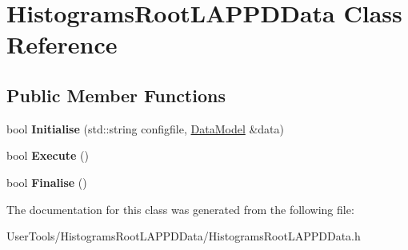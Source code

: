 \hypertarget{classHistogramsRootLAPPDData}{
\section{HistogramsRootLAPPDData Class Reference}
\label{classHistogramsRootLAPPDData}
}
\subsection*{Public Member Functions}
\begin{DoxyCompactItemize}
\item 
\hypertarget{classHistogramsRootLAPPDData_ab87ee19ac23e1a888976464ec0e9b199}{
bool {\bfseries Initialise} (std::string configfile, \hyperlink{classDataModel}{DataModel} \&data)}
\label{classHistogramsRootLAPPDData_ab87ee19ac23e1a888976464ec0e9b199}

\item 
\hypertarget{classHistogramsRootLAPPDData_a81c098fc773fb9bb365beb47aefd67d7}{
bool {\bfseries Execute} ()}
\label{classHistogramsRootLAPPDData_a81c098fc773fb9bb365beb47aefd67d7}

\item 
\hypertarget{classHistogramsRootLAPPDData_abc484166b3afed20afc9a702c3a003da}{
bool {\bfseries Finalise} ()}
\label{classHistogramsRootLAPPDData_abc484166b3afed20afc9a702c3a003da}

\end{DoxyCompactItemize}


The documentation for this class was generated from the following file:\begin{DoxyCompactItemize}
\item 
UserTools/HistogramsRootLAPPDData/HistogramsRootLAPPDData.h\end{DoxyCompactItemize}
